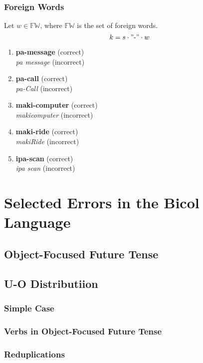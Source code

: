 \subsubsection{Foreign Words}
Let \(w \in \mathbb{FW}\), where \(\mathbb{FW}\) is the set of foreign words.
\[
      k = s \cdot "\text{-}" \cdot w
\]
\begin{example}
\end{example}
\begin{enumerate}
      \item \textbf{pa-message} (correct) \\
            \textit{pa message} (incorrect)
      \item \textbf{pa-call} (correct) \\
            \textit{pa-Call} (incorrect)
      \item \textbf{maki-computer} (correct) \\
            \textit{makicomputer} (incorrect)
      \item \textbf{maki-ride} (correct) \\
            \textit{makiRide} (incorrect)
      \item \textbf{ipa-scan} (correct) \\
            \textit{ipa scan} (incorrect)
\end{enumerate}

\section{Selected Errors in the Bicol Language}
\subsection{Object-Focused Future Tense}
\subsection{U-O Distributiion}
\subsubsection{Simple Case}
\subsubsection{Verbs in Object-Focused Future Tense}
\subsubsection{Reduplications}

